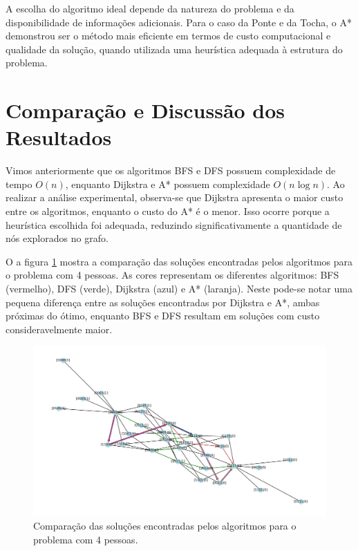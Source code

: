\documentclass[12pt,a4paper]{article}
\begin{document}
A escolha do algoritmo ideal depende da natureza do problema e da disponibilidade de informações adicionais. 
Para o caso da Ponte e da Tocha, o A* demonstrou ser o método mais eficiente em termos de custo computacional e qualidade da solução, quando utilizada uma heurística adequada à estrutura do problema.

\section{Comparação e Discussão dos Resultados}

Vimos anteriormente que os algoritmos BFS e DFS possuem complexidade de tempo $O(n)$, enquanto Dijkstra e A* possuem complexidade $O(n \log n)$. Ao realizar a análise experimental, observa-se que Dijkstra apresenta o maior custo entre os algoritmos, enquanto o custo do A* é o menor. Isso ocorre porque a heurística escolhida foi adequada, reduzindo significativamente a quantidade de nós explorados no grafo.

O a figura \ref{fig:fig_graph_comparsion} mostra a comparação das soluções encontradas pelos algoritmos para o problema com 4 pessoas. As cores representam os diferentes algoritmos: BFS (vermelho), DFS (verde), Dijkstra (azul) e A* (laranja). Neste pode-se notar uma pequena diferença entre as soluções encontradas por Dijkstra e A*, ambas próximas do ótimo, enquanto BFS e DFS resultam em soluções com custo consideravelmente maior.

\begin{figure}[H]
    \centering
    \includegraphics[width=0.8\linewidth]{graph_comparsion_complete_labels.png}
    \caption{Comparação das soluções encontradas pelos algoritmos para o problema com 4 pessoas.}
    \label{fig:fig_graph_comparsion}
    \hspace{\fill}
\end{figure}
\end{document}
